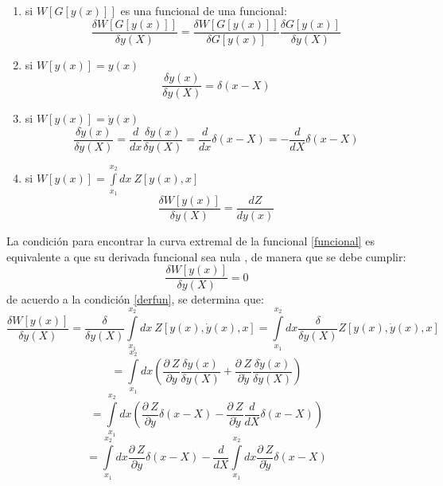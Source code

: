 \documentclass[a4paper,12pt]{article}
\begin{document}
\begin{enumerate}
\item[\fbox{1.}] si $W[G[y(x)]]$ es una funcional de una funcional:
\begin{equation}
\frac{\delta W[G[y(x)]]}{\delta y(X)}=\frac{\delta  W[G[y(x)]]}{\delta G[y(x)]}\frac{\delta G[y(x)]}{\delta y(X)} 
\end{equation}
\item[\fbox{2.}] si $W[y(x)]=y(x)$
\begin{equation}
\frac{\delta y(x)}{\delta y(X)}=\delta(x-X) 
\end{equation}
\item[\fbox{3.}] si $W[y(x)]=\dot y(x)$
\begin{equation}
\frac{\delta\dot y(x)}{\delta y(X)}=\frac{d }{d x} \frac{\delta y(x)}{\delta y(X)}=\frac{d }{d x}\delta(x-X)=-\frac{d }{d X}\delta(x-X) 
\end{equation}
\item[\fbox{4.}] si $W[y(x)]=\int\limits_{x_1}^{x_2}dx\ Z[y(x),x]$
\begin{equation}
\frac{\delta W[y(x)]}{\delta y(X)}=\frac{d Z}{d y(x) } 
\end{equation}
\end{enumerate}
La condición para encontrar la curva extremal de la funcional \eqref{funcional} es equivalente a que su derivada funcional sea nula \cite{funcional}, de manera que se debe cumplir:
\begin{equation}
\frac{\delta W[y(x)]}{\delta y(X)}=0
\label{derfun}
\end{equation}
de acuerdo a la condición \eqref{derfun}, se determina que:
\begin{equation}
\frac{\delta W[y(x)]}{\delta y(X)}=\frac{\delta }{\delta y(X)}\int\limits_{x_1}^{x_2}dx\ Z[y(x),\dot y(x),x]=\int\limits_{x_1}^{x_2}dx\frac{\delta }{\delta y(X)} Z[y(x),\dot y(x),x] 
\end{equation}
\begin{equation}
=\int\limits_{x_1}^{x_2}dx\left(\frac{\partial \ Z}{\partial y}\frac{\delta y(x)}{\delta y(X)}+\frac{\partial \ Z}{\partial \dot y}\frac{\delta \dot y(x)}{\delta y(X)}  \right) 
\end{equation}
\begin{equation}
=\int\limits_{x_1}^{x_2}dx\left(\frac{\partial \ Z}{\partial y}\delta(x-X)-\frac{\partial \ Z}{\partial \dot y}\frac{d }{d X}\delta(x-X)\right) 
\end{equation}
\begin{equation}
=\int\limits_{x_1}^{x_2}dx\frac{\partial \ Z}{\partial y}\delta(x-X)-\frac{d }{d X}\int\limits_{x_1}^{x_2}dx\frac{\partial \ Z}{\partial \dot y}\delta(x-X) 
\end{equation}
\end{document}
